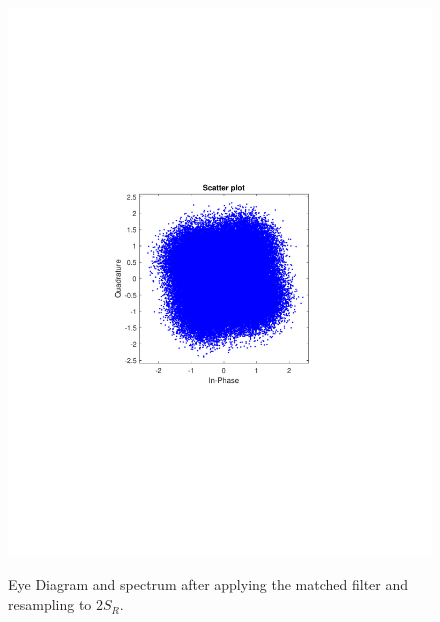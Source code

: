 \begin{refsection}
\begin{figure}[H]
\begin{minipage}{0.30\textwidth}
		\includegraphics[clip, trim=4cm 8cm 4cm 8cm, width=1\textwidth]{./sdf/m_qam_system/figures/expResults/homodyne/2_const_4GBdInSig13dB_AfMF.pdf}
		\label{fig:4GBdSpecBefFec}
	\end{minipage}
	\caption{Eye Diagram and spectrum after applying the matched filter and resampling to $2 S_R$.}
	\label{fig:4GBMFHm}
\end{figure}


\end{refsection}

